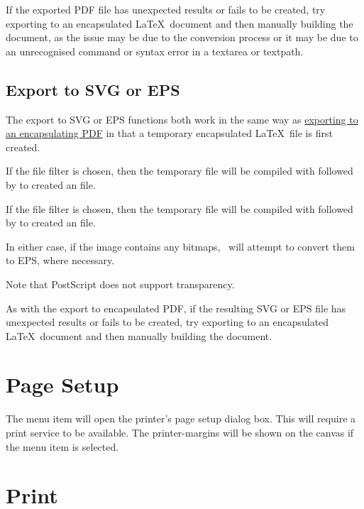 If the exported PDF file has unexpected results or fails to be
created, try exporting to an encapsulated \LaTeX\ document and then
manually building the document, as the issue may be due to the
conversion process or it may be due to an unrecognised command or
syntax error in a \gls{textarea} or \gls{textpath}.


\subsection{Export to SVG or EPS}\label{sec:exportsvgeps}

The export to SVG or EPS functions both work in the same way
as \hyperref[sec:exportdoc]{exporting to an encapsulating PDF}
in that a temporary encapsulated \LaTeX\ file is first created.

If the  file filter is chosen, then the temporary
file will be compiled with  followed by
 to created an   file.

If the  file filter is chosen, then the temporary
file will be compiled with  followed by
 to created an  file.

In either case, if the image contains any
\glspl{bitmap}, \FlowframTk\ will attempt to convert
them to EPS, where necessary.

\begin{important}
Note that PostScript does not support transparency.
\end{important}

As with the export to encapsulated PDF, if the resulting SVG or EPS
file has unexpected results or fails to be created, try exporting to
an encapsulated \LaTeX\ document and then manually building the
document.

\section{Page Setup}\label{sec:pagesetup}


The  menu item will open the printer's page
setup dialog box. This will require a print service to be available.
The \glspl{printer-margin} will be shown on the \gls{canvas} if the
 menu item is selected.

\section{Print}\label{sec:print}


